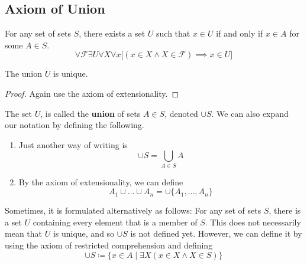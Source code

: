 \subsection{Axiom of Union}

  \begin{axiom}
    \label{thm:axiom-of-union} 
    For any set of sets $S$, there exists a set $U$ such that $x \in U$ if and only if $x \in A$ for some $A \in S$. 
    \begin{equation}
      \forall \mathcal{F} \exists U \forall X \forall x \big[ (x \in X \land X \in \mathcal{F}) \implies x \in U \big]
    \end{equation}
  \end{axiom}

  \begin{lemma}
    \label{thm:union-is-unique}
    The union $U$ is unique. 
  \end{lemma}
  \begin{proof}
    Again use the axiom of extensionality. 
  \end{proof} 

  \begin{definition}[Union]
    \label{def:union}
    The set $U$, is called the \textbf{union} of sets $A \in S$, denoted $\cup S$. We can also expand our notation by defining the following. 
    \begin{enumerate}
      \item Just another way of writing is 
        \begin{equation}
          \cup S = \bigcup_{A \in S} A
        \end{equation}

      \item By the axiom of extensionality, we can define 
        \begin{equation}
          A_1 \cup \ldots \cup A_n = \cup \{A_1, \ldots, A_n\}
        \end{equation}
    \end{enumerate}
  \end{definition}

  Sometimes, it is formulated alternatively as follows: For any set of sets $S$, there is a set $U$ containing every element that is a member of $S$. This does not necessarily mean that $U$ is unique, and so $\cup S$ is not defined yet. However, we can define it by using the axiom of restricted comprehension and defining 
  \begin{equation}
    \cup S \coloneqq \{ x \in A \mid \exists X (x \in X \land X \in S ) \}
  \end{equation}

